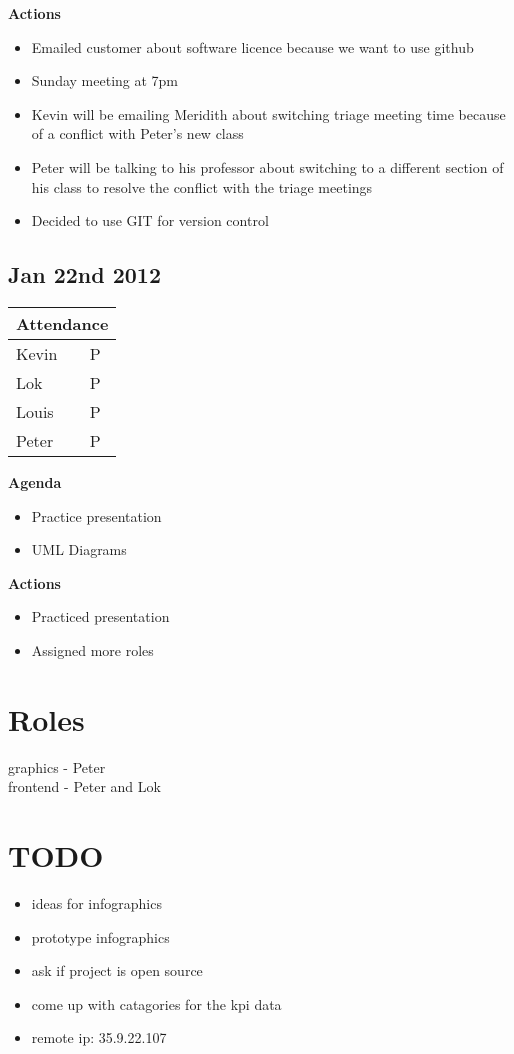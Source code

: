\documentclass[11pt,a4paper,oneside]{article}
\begin{document}
\textbf{Actions}\\
\begin{itemize}
\item Emailed customer about software licence because we want to use github
\item Sunday meeting at 7pm
\item Kevin will be emailing Meridith about switching triage meeting time because of a conflict with Peter's new class
\item Peter will be talking to his professor about switching to a different section of his class to resolve the conflict with the triage meetings
\item Decided to use GIT for version control
\end{itemize}


\subsection{Jan 22nd 2012}
\begin{tabular}{ | l | l | }
\hline
\multicolumn{2}{|c|}{Attendance} \\
\hline
Kevin & P\\
Lok   & P\\
Louis & P\\
Peter & P\\
\hline
\end{tabular}

\textbf{Agenda}\\
\begin{itemize}
\item Practice presentation
\item UML Diagrams
\end{itemize}

\textbf{Actions}\\
\begin{itemize}
\item Practiced presentation
\item Assigned more roles
\end{itemize}

\section{Roles}
graphics - Peter\\
frontend - Peter and Lok\\


\section{TODO}
\begin{itemize}
\item ideas for infographics
\item prototype infographics
\item ask if project is open source
\item come up with catagories for the kpi data
\item remote ip: 35.9.22.107
\end{itemize}
\end{document}
